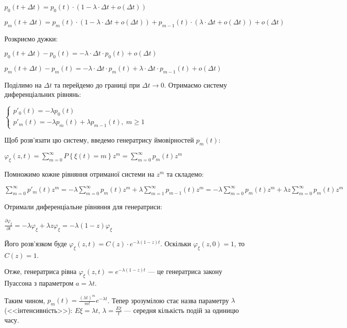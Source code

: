 $p_0(t+\Delta t) = p_0(t) \cdot (1 - \lambda \cdot \Delta t + o(\Delta t))$

$p_m(t+\Delta t) = p_m(t) \cdot (1 - \lambda \cdot \Delta t + o(\Delta t)) + p_{m-1}(t) \cdot (\lambda \cdot \Delta t + o(\Delta t)) + o(\Delta t)$

\noindent Розкриємо дужки:

$p_0(t+\Delta t) - p_0(t) = -\lambda \cdot \Delta t \cdot p_0(t) + o(\Delta t)$
\nopagebreak

$p_m(t+\Delta t) - p_m(t) = -\lambda \cdot \Delta t \cdot p_m(t) + \lambda\cdot\Delta t \cdot p_{m-1}(t) + o(\Delta t)$

\noindent Поділимо на $\Delta t$ та перейдемо до границі при $\Delta t \rightarrow 0$.
Отримаємо систему диференціальних рівнянь:

$\begin{cases}
    p'_0(t) = - \lambda p_0(t) \\
    p'_m(t) = - \lambda p_m(t) + \lambda p_{m-1}(t), \; m \geq 1
\end{cases}$

\noindent Щоб розв'язати цю систему, введемо генератрису ймовірностей $p_m(t)$:

$\varphi_\xi(z, t) = \sum\limits_{m=0}^{\infty} P\left\{\xi(t) = m\right\} z^m = \sum\limits_{m=0}^{\infty} p_m(t) z^m$ 

\noindent Помножимо кожне рівняння отриманої системи на $z^m$ та складемо:

$\sum\limits_{m=0}^{\infty} p'_m(t) z^m = -\lambda \sum\limits_{m=0}^{\infty} p_m(t) z^m + \lambda \sum\limits_{m=1}^{\infty} p_{m-1}(t) z^m = 
-\lambda \sum\limits_{m=0}^{\infty} p_m(t) z^m + \lambda z \sum\limits_{m=0}^{\infty} p_{m}(t) z^m$

\noindent Отримали диференціальне рівняння для генератриси:

$\frac{\partial \varphi_\xi}{\partial t} = - \lambda \varphi_\xi + \lambda z \varphi_\xi = -\lambda(1-z) \varphi_\xi$

\noindent Його розв'язком буде $\varphi_\xi(z, t) = C(z) \cdot e^{-\lambda(1-z)t}$.
Оскільки $\varphi_\xi(z, 0) = 1$, то $C(z) = 1$.

Отже, генератриса рівна $\varphi_\xi(z, t) = e^{-\lambda(1-z)t}$ --- це генератриса закону Пуассона з параметром $a=\lambda t$.

Таким чином, $p_m(t) = \frac{(\lambda t)^m}{m!}e^{-\lambda t}$. 
Тепер зрозумілою стає назва параметру $\lambda$ (<<інтенсивність>>): $E\xi = \lambda t$, $\lambda = \frac{E\xi}{t}$ --- середня кількість подій за одиницю часу.

